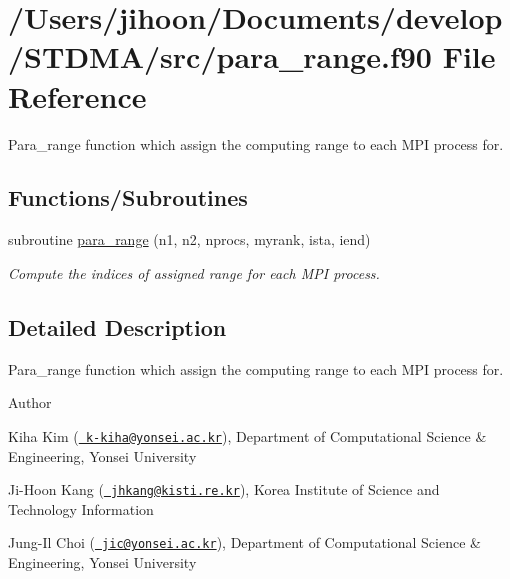 \hypertarget{para__range_8f90}{}\section{/\+Users/jihoon/\+Documents/develop/\+S\+T\+D\+M\+A/src/para\+\_\+range.f90 File Reference}
\label{para__range_8f90}


Para\+\_\+range function which assign the computing range to each M\+PI process for.  


\subsection*{Functions/\+Subroutines}
\begin{DoxyCompactItemize}
\item 
subroutine \mbox{\hyperlink{para__range_8f90_ab75ab386311975aa4ff7cac06798fcd4}{para\+\_\+range}} (n1, n2, nprocs, myrank, ista, iend)
\begin{DoxyCompactList}\small\item\em Compute the indices of assigned range for each M\+PI process. \end{DoxyCompactList}\end{DoxyCompactItemize}


\subsection{Detailed Description}
Para\+\_\+range function which assign the computing range to each M\+PI process for. 

\begin{DoxyAuthor}{Author}

\end{DoxyAuthor}

\begin{DoxyItemize}
\item Kiha Kim (\href{mailto:k-kiha@yonsei.ac.kr}{\texttt{ k-\/kiha@yonsei.\+ac.\+kr}}), Department of Computational Science \& Engineering, Yonsei University
\item Ji-\/\+Hoon Kang (\href{mailto:jhkang@kisti.re.kr}{\texttt{ jhkang@kisti.\+re.\+kr}}), Korea Institute of Science and Technology Information
\item Jung-\/\+Il Choi (\href{mailto:jic@yonsei.ac.kr}{\texttt{ jic@yonsei.\+ac.\+kr}}), Department of Computational Science \& Engineering, Yonsei University
\end{DoxyItemize}

